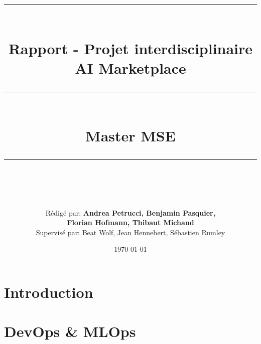 \documentclass[11pt,a4paper]{report}
\newcommand{\horrule}[1]{\rule{\linewidth}{#1}} 	%
\begin{document}



\title{
         \\
        
        \horrule{2pt} \\[0.4cm]
        \huge{\textbf{Rapport - Projet interdisciplinaire} \\
        AI Marketplace}\\
        \horrule{1pt} \\[0.5cm]
        Master MSE
        \horrule{2pt} \\[0.5cm]
        }
\author{Rédigé par: \textbf{Andrea Petrucci, Benjamin Pasquier,} \\ \textbf{Florian Hofmann, Thibaut Michaud} \vspace{5mm} \\
        Supervisé par: Beat Wolf, Jean Hennebert, Sébastien Rumley}
\date{\today}
\maketitle



\tableofcontents
\newpage


\listoffigures
\newpage


\chapter{Introduction}

\newpage

\chapter{DevOps \& MLOps}

\vspace{10mm}
\newpage
\end{document}
